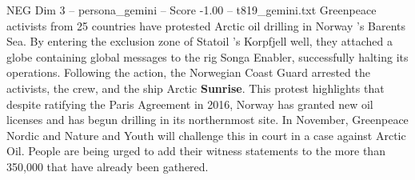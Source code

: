 \begin{textsample}{NEG Dim 3 – persona\_gemini – Score -1.00 – t819\_gemini.txt}  \label{ex:f3_neg_001}
Greenpeace activists from 25 countries have protested Arctic oil drilling in Norway 's Barents Sea.
By entering the exclusion zone of Statoil ’s Korpfjell well, they attached a globe containing global messages to the rig Songa Enabler, successfully halting its operations.
Following the action, the Norwegian Coast Guard arrested the activists, the crew, and the ship Arctic \textbf{Sunrise}.
This protest highlights that despite ratifying the Paris Agreement in 2016, Norway has granted new oil licenses and has begun drilling in its northernmost site.
In November, Greenpeace Nordic and Nature and Youth will challenge this in court in a case against Arctic Oil.
People are being urged to add their witness statements to the more than 350,000 that have already been gathered.

\end{textsample}

